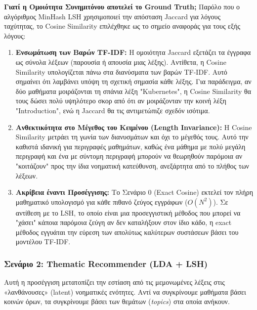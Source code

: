 \documentclass[a4paper,12pt]{article}
\begin{document}
\textbf{Γιατί η Ομοιότητα Συνημιτόνου αποτελεί το Ground Truth;} Παρόλο που ο αλγόριθμος MinHash LSH χρησιμοποιεί την απόσταση Jaccard για λόγους ταχύτητας, το Cosine Similarity επιλέχθηκε ως το σημείο αναφοράς για τους εξής λόγους:

\begin{enumerate} 
    \item \textbf{Ενσωμάτωση των Βαρών TF-IDF:} Η ομοιότητα Jaccard εξετάζει τα έγγραφα ως σύνολα λέξεων (παρουσία ή απουσία μιας λέξης). Αντίθετα, η Cosine Similarity υπολογίζεται πάνω στα διανύσματα των βαρών TF-IDF. Αυτό σημαίνει ότι λαμβάνει υπόψη τη σχετική σημασία κάθε λέξης. Για παράδειγμα, αν δύο μαθήματα μοιράζονται τη σπάνια λέξη "Kubernetes", η Cosine Similarity θα τους δώσει πολύ υψηλότερο σκορ από ότι αν μοιράζονταν την κοινή λέξη "Introduction", ενώ η Jaccard θα τις αντιμετώπιζε σχεδόν ισότιμα.
    
    \item \textbf{Ανθεκτικότητα στο Μέγεθος του Κειμένου (Length Invariance):} Η Cosine Similarity μετράει τη γωνία των διανυσμάτων και όχι το μέγεθός τους. Αυτό την καθιστά ιδανική για περιγραφές μαθημάτων, καθώς ένα μάθημα με πολύ μεγάλη περιγραφή και ένα με σύντομη περιγραφή μπορούν να θεωρηθούν παρόμοια αν "κοιτάζουν" προς την ίδια νοηματική κατεύθυνση, ανεξάρτητα από το πλήθος των λέξεων.
    
    \item \textbf{Ακρίβεια έναντι Προσέγγισης:} Το Σενάριο 0 (Exact Cosine) εκτελεί τον πλήρη μαθηματικό υπολογισμό για κάθε πιθανό ζεύγος εγγράφων ($O(N^2)$). Σε αντίθεση με το LSH, το οποίο είναι μια προσεγγιστική μέθοδος που μπορεί να "χάσει" κάποια παρόμοια ζεύγη αν δεν καταλήξουν στον ίδιο κάδο, η exact μέθοδος εγγυάται την εύρεση των απολύτως καλύτερων συστάσεων βάσει του μοντέλου TF-IDF.
\end{enumerate}

\subsubsection{Σενάριο 2: Thematic Recommender (LDA + LSH)} 
Αυτή η προσέγγιση μετατοπίζει την εστίαση από τις μεμονωμένες λέξεις στις «λανθάνουσες» (latent) νοηματικές ενότητες. Αντί να συγκρίνουμε μαθήματα βάσει κοινών όρων, τα συγκρίνουμε βάσει των θεμάτων (\textit{topics}) στα οποία ανήκουν.
\end{document}
